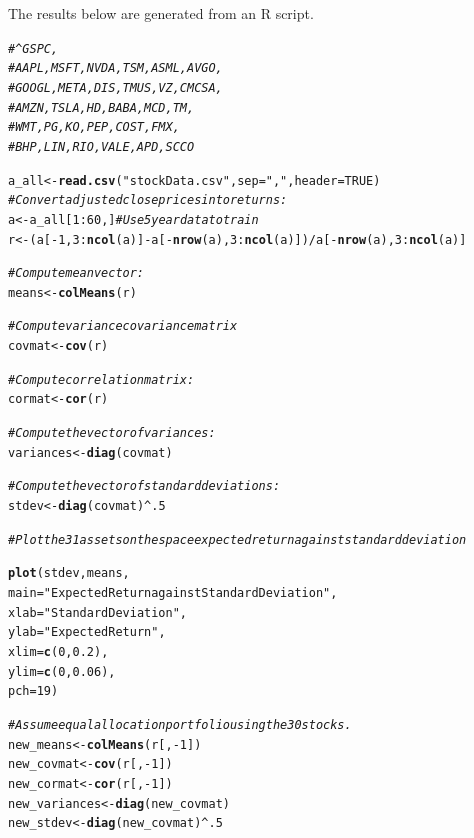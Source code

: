 \documentclass{article}\usepackage[]{graphicx}\usepackage[]{xcolor}
\makeatletter
\newcommand{\hlnum}[1]{\textcolor[rgb]{0.686,0.059,0.569}{#1}}%
\newcommand{\hlstr}[1]{\textcolor[rgb]{0.192,0.494,0.8}{#1}}%
\newcommand{\hlcom}[1]{\textcolor[rgb]{0.678,0.584,0.686}{\textit{#1}}}%
\newcommand{\hlopt}[1]{\textcolor[rgb]{0,0,0}{#1}}%
\newcommand{\hlstd}[1]{\textcolor[rgb]{0.345,0.345,0.345}{#1}}%
\newcommand{\hlkwb}[1]{\textcolor[rgb]{0.69,0.353,0.396}{#1}}%
\newcommand{\hlkwc}[1]{\textcolor[rgb]{0.333,0.667,0.333}{#1}}%
\newcommand{\hlkwd}[1]{\textcolor[rgb]{0.737,0.353,0.396}{\textbf{#1}}}%
\newenvironment{kframe}{%
 \def\at@end@of@kframe{}%
 \ifinner\ifhmode%
  \def\at@end@of@kframe{\end{minipage}}%
  \begin{minipage}{\columnwidth}%
 \fi\fi%
 \def\FrameCommand##1{\hskip\@totalleftmargin \hskip-\fboxsep
 \colorbox{shadecolor}{##1}\hskip-\fboxsep
     \hskip-\linewidth \hskip-\@totalleftmargin \hskip\columnwidth}%
 \MakeFramed {\advance\hsize-\width
   \@totalleftmargin\z@ \linewidth\hsize
   \@setminipage}}%
 {\par\unskip\endMakeFramed%
 \at@end@of@kframe}
\newenvironment{knitrout}{}{} %
\makeatother
\begin{document}
The results below are generated from an R script.

\begin{knitrout}
\color{fgcolor}\begin{kframe}
\begin{alltt}
\hlcom{#^GSPC,}
\hlcom{#AAPL,MSFT,NVDA,TSM,ASML,AVGO,}
\hlcom{#GOOGL,META,DIS,TMUS,VZ,CMCSA,}
\hlcom{#AMZN,TSLA,HD,BABA,MCD,TM,}
\hlcom{#WMT,PG,KO,PEP,COST,FMX,}
\hlcom{#BHP,LIN,RIO,VALE,APD,SCCO}

\hlstd{a_all} \hlkwb{<-} \hlkwd{read.csv}\hlstd{(}\hlstr{"stockData.csv"}\hlstd{,} \hlkwc{sep}\hlstd{=}\hlstr{","}\hlstd{,} \hlkwc{header}\hlstd{=}\hlnum{TRUE}\hlstd{)}
\hlcom{#Convert adjusted close prices into returns:}
\hlstd{a} \hlkwb{<-} \hlstd{a_all[}\hlnum{1}\hlopt{:}\hlnum{60}\hlstd{,]} \hlcom{# Use 5 year data to train}
\hlstd{r} \hlkwb{<-} \hlstd{(a[}\hlopt{-}\hlnum{1}\hlstd{,}\hlnum{3}\hlopt{:}\hlkwd{ncol}\hlstd{(a)]}\hlopt{-}\hlstd{a[}\hlopt{-}\hlkwd{nrow}\hlstd{(a),}\hlnum{3}\hlopt{:}\hlkwd{ncol}\hlstd{(a)])}\hlopt{/}\hlstd{a[}\hlopt{-}\hlkwd{nrow}\hlstd{(a),}\hlnum{3}\hlopt{:}\hlkwd{ncol}\hlstd{(a)]}

\hlcom{#Compute mean vector:}
\hlstd{means} \hlkwb{<-} \hlkwd{colMeans}\hlstd{(r)}

\hlcom{#Compute variance covariance matrix}
\hlstd{covmat} \hlkwb{<-} \hlkwd{cov}\hlstd{(r)}

\hlcom{#Compute correlation matrix:}
\hlstd{cormat} \hlkwb{<-} \hlkwd{cor}\hlstd{(r)}

\hlcom{#Compute the vector of variances:}
\hlstd{variances} \hlkwb{<-} \hlkwd{diag}\hlstd{(covmat)}

\hlcom{#Compute the vector of standard deviations:}
\hlstd{stdev} \hlkwb{<-} \hlkwd{diag}\hlstd{(covmat)}\hlopt{^}\hlnum{.5}

\hlcom{#Plot the 31 assets on the space expected return against standard deviation}

\hlkwd{plot}\hlstd{(stdev, means,}
     \hlkwc{main}\hlstd{=}\hlstr{"Expected Return against Standard Deviation"}\hlstd{,}
     \hlkwc{xlab}\hlstd{=}\hlstr{"Standard Deviation"}\hlstd{,}
     \hlkwc{ylab}\hlstd{=}\hlstr{"Expected Return"}\hlstd{,}
     \hlkwc{xlim} \hlstd{=} \hlkwd{c}\hlstd{(}\hlnum{0}\hlstd{,} \hlnum{0.2}\hlstd{),}
     \hlkwc{ylim} \hlstd{=} \hlkwd{c}\hlstd{(}\hlnum{0}\hlstd{,} \hlnum{0.06}\hlstd{),}
     \hlkwc{pch}\hlstd{=}\hlnum{19}\hlstd{)}

\hlcom{#Assume equal allocation portfolio using the 30 stocks.}
\hlstd{new_means} \hlkwb{<-} \hlkwd{colMeans}\hlstd{(r[,}\hlopt{-}\hlnum{1}\hlstd{])}
\hlstd{new_covmat} \hlkwb{<-} \hlkwd{cov}\hlstd{(r[,}\hlopt{-}\hlnum{1}\hlstd{])}
\hlstd{new_cormat} \hlkwb{<-} \hlkwd{cor}\hlstd{(r[,}\hlopt{-}\hlnum{1}\hlstd{])}
\hlstd{new_variances} \hlkwb{<-} \hlkwd{diag}\hlstd{(new_covmat)}
\hlstd{new_stdev} \hlkwb{<-} \hlkwd{diag}\hlstd{(new_covmat)}\hlopt{^}\hlnum{.5}


\end{alltt}
\end{kframe}
\end{knitrout}
\end{document}
